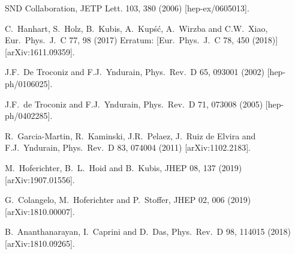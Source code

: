 \begin{thebibliography}{99}
          SND Collaboration, JETP Lett. 103, 380 (2006) [hep-ex/0605013].

  C.~Hanhart, S.~Holz, B.~Kubis, A.~Kup\'s\'c, A.~Wirzba and C.W.~Xiao,
  Eur.\ Phys.\ J.\ C 77, 98 (2017)
   Erratum: [Eur.\ Phys.\ J.\ C 78, 450 (2018)]
  [arXiv:1611.09359].

  J.F.~De Troconiz and F.J.~Yndurain,
  Phys.\ Rev.\ D 65, 093001 (2002)
  [hep-ph/0106025].

  J.F.~de Troconiz and F.J.~Yndurain,
  Phys.\ Rev.\ D 71, 073008 (2005) 
  [hep-ph/0402285].

  R.~Garcia-Martin, R.~Kaminski, J.R.~Pelaez, J.~Ruiz de Elvira and F.J.~Yndurain,
  Phys.\ Rev.\ D 83, 074004 (2011)
  [arXiv:1102.2183].

  M.~Hoferichter, B.~L.~Hoid and B.~Kubis,
  JHEP 08, 137 (2019)
  [arXiv:1907.01556].

  G.~Colangelo, M.~Hoferichter and P.~Stoffer,
  JHEP 02, 006 (2019)
  [arXiv:1810.00007].
  
  B.~Ananthanarayan, I.~Caprini and D.~Das,
  Phys.\ Rev.\ D 98, 114015 (2018)  
  [arXiv:1810.09265].
  

\end{thebibliography}

